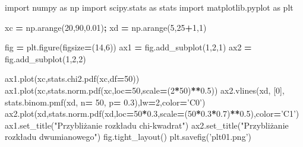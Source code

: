 \documentclass[polish,]{book}
\newenvironment{Shaded}{\begin{snugshade}}{\end{snugshade}}
\newcommand{\DecValTok}[1]{\textcolor[rgb]{0.00,0.00,0.81}{#1}}
\newcommand{\FloatTok}[1]{\textcolor[rgb]{0.00,0.00,0.81}{#1}}
\newcommand{\ImportTok}[1]{#1}
\newcommand{\NormalTok}[1]{#1}
\newcommand{\OperatorTok}[1]{\textcolor[rgb]{0.81,0.36,0.00}{\textbf{#1}}}
\newcommand{\StringTok}[1]{\textcolor[rgb]{0.31,0.60,0.02}{#1}}
\begin{document}
\begin{Shaded}
\begin{Highlighting}[]
\ImportTok{import}\NormalTok{ numpy }\ImportTok{as}\NormalTok{ np}
\ImportTok{import}\NormalTok{ scipy.stats }\ImportTok{as}\NormalTok{ stats}
\ImportTok{import}\NormalTok{ matplotlib.pyplot }\ImportTok{as}\NormalTok{ plt}
  
\NormalTok{xc }\OperatorTok{=}\NormalTok{ np.arange(}\DecValTok{20}\NormalTok{,}\DecValTok{90}\NormalTok{,}\FloatTok{0.01}\NormalTok{)}\OperatorTok{;}\NormalTok{ xd }\OperatorTok{=}\NormalTok{ np.arange(}\DecValTok{5}\NormalTok{,}\DecValTok{25}\OperatorTok{+}\DecValTok{1}\NormalTok{,}\DecValTok{1}\NormalTok{)}

\NormalTok{fig }\OperatorTok{=}\NormalTok{ plt.figure(figsize}\OperatorTok{=}\NormalTok{(}\DecValTok{14}\NormalTok{,}\DecValTok{6}\NormalTok{))}
\NormalTok{ax1 }\OperatorTok{=}\NormalTok{ fig.add_subplot(}\DecValTok{1}\NormalTok{,}\DecValTok{2}\NormalTok{,}\DecValTok{1}\NormalTok{)}
\NormalTok{ax2 }\OperatorTok{=}\NormalTok{ fig.add_subplot(}\DecValTok{1}\NormalTok{,}\DecValTok{2}\NormalTok{,}\DecValTok{2}\NormalTok{)}

\NormalTok{ax1.plot(xc,stats.chi2.pdf(xc,df}\OperatorTok{=}\DecValTok{50}\NormalTok{))}
\NormalTok{ax1.plot(xc,stats.norm.pdf(xc,loc}\OperatorTok{=}\DecValTok{50}\NormalTok{,scale}\OperatorTok{=}\NormalTok{(}\DecValTok{2}\OperatorTok{*}\DecValTok{50}\NormalTok{)}\OperatorTok{**}\FloatTok{0.5}\NormalTok{))}
\NormalTok{ax2.vlines(xd, [}\DecValTok{0}\NormalTok{], stats.binom.pmf(xd, n}\OperatorTok{=} \DecValTok{50}\NormalTok{, p}\OperatorTok{=} \FloatTok{0.3}\NormalTok{),lw}\OperatorTok{=}\DecValTok{2}\NormalTok{,color}\OperatorTok{=}\StringTok{'C0'}\NormalTok{)}
\NormalTok{ax2.plot(xd,stats.norm.pdf(xd,loc}\OperatorTok{=}\DecValTok{50}\OperatorTok{*}\FloatTok{0.3}\NormalTok{,scale}\OperatorTok{=}\NormalTok{(}\DecValTok{50}\OperatorTok{*}\FloatTok{0.3}\OperatorTok{*}\FloatTok{0.7}\NormalTok{)}\OperatorTok{**}\FloatTok{0.5}\NormalTok{),color}\OperatorTok{=}\StringTok{'C1'}\NormalTok{)}
\NormalTok{ax1.set_title(}\StringTok{"Przybliżanie rozkładu chi-kwadrat"}\NormalTok{)}
\NormalTok{ax2.set_title(}\StringTok{"Przybliżanie rozkładu dwumianowego"}\NormalTok{)}
\NormalTok{fig.tight_layout()}
\NormalTok{plt.savefig(}\StringTok{'plt01.png'}\NormalTok{)}
\end{Highlighting}
\end{Shaded}
\end{document}
